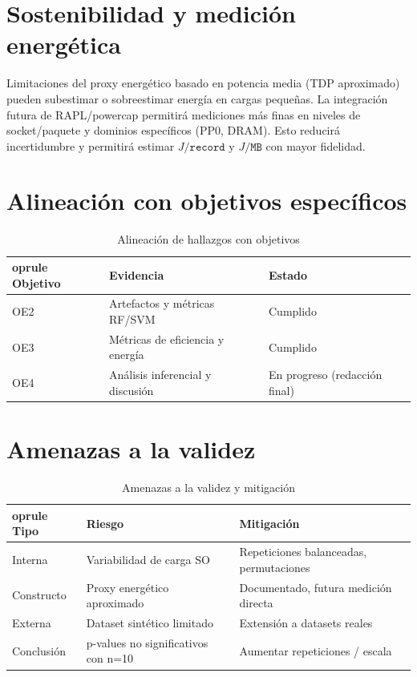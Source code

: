 \documentclass[12pt,oneside]{report}
\begin{document}
    \section{Sostenibilidad y medición energética}
    Limitaciones del proxy energético basado en potencia media (TDP aproximado) pueden subestimar o sobreestimar energía en cargas pequeñas. La integración futura de RAPL/powercap permitirá mediciones más finas en niveles de socket/paquete y dominios específicos (PP0, DRAM). Esto reducirá incertidumbre y permitirá estimar \(J/\texttt{record}\) y \(J/\texttt{MB}\) con mayor fidelidad.

    \section{Alineación con objetivos específicos}
    \begin{table}[htbp]
    \centering
    \caption{Alineación de hallazgos con objetivos}
    \label{tab:alineacion-objetivos}
    \begin{tabular}{l l l}
    	oprule
    Objetivo & Evidencia & Estado \\
    \midrule
    OE2 & Artefactos y métricas RF/SVM & Cumplido \\
    OE3 & Métricas de eficiencia y energía & Cumplido \\
    OE4 & Análisis inferencial y discusión & En progreso (redacción final) \\
    \bottomrule
    \end{tabular}
    \end{table}

    \section{Amenazas a la validez}
    \begin{table}[htbp]
    \centering
    \caption{Amenazas a la validez y mitigación}
    \label{tab:amenazas}
    \begin{tabular}{l l l}
    	oprule
    Tipo & Riesgo & Mitigación \\
    \midrule
    Interna & Variabilidad de carga SO & Repeticiones balanceadas, permutaciones \\
    Constructo & Proxy energético aproximado & Documentado, futura medición directa \\
    Externa & Dataset sintético limitado & Extensión a datasets reales \\
    Conclusión & p-values no significativos con n=10 & Aumentar repeticiones / escala \\
    \bottomrule
    \end{tabular}
    \end{table}
\end{document}
